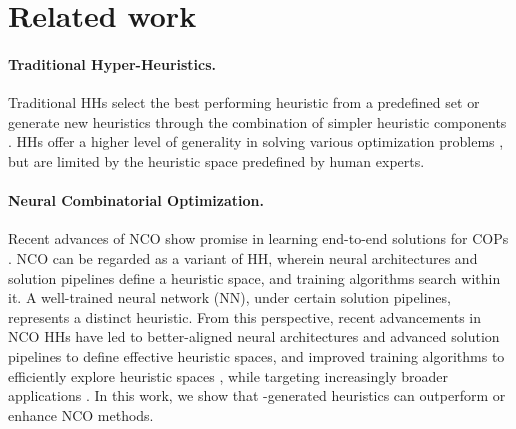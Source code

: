 \section{Related work}
\paragraph*{Traditional Hyper-Heuristics.}
Traditional HHs select the best performing heuristic from a predefined set \cite{drake2020recent_advances_in_selection_hh} or generate new heuristics through the combination of simpler heuristic components \cite{duflo2019gp_hh_tsp, zhao2023survey_automated_design_metaheuristic_algorithms}. HHs offer a higher level of generality in solving various optimization problems \cite{zhu2023surgical_case_assignment_problem_hh,zambrano2023automatic_hh_for_buck_boost,guerriero2023hierarchical_hh_bin_packing,lim2023simulated_annealing_hh_fjsp, zhang2023q_learning_hh, mohammad2023_hh_lion_optimizer}, but are limited by the heuristic space predefined by human experts.

\paragraph*{Neural Combinatorial Optimization.}
Recent advances of NCO show promise in learning end-to-end solutions for COPs \cite{bengio2021_ml4co_survey, yang2023_rl4co_survey, berto2023rl4co}. NCO can be regarded as a variant of HH, wherein neural architectures and solution pipelines define a heuristic space, and training algorithms search within it. A well-trained neural network (NN), under certain solution pipelines, represents a distinct heuristic. From this perspective, recent advancements in NCO HHs have led to better-aligned neural architectures \cite{jin2023pointerformer, luo2023nco_heavy_decoder, kim2023_gflownets, son2023_equity_transformer} and advanced solution pipelines \cite{kim2021lcp, ma2023neu_kopt, li2023t2t, xiao2023_nar_solver_tsp, ye2024glop, dernedde2024moco, bu2024tackling} to define effective heuristic spaces, and improved training algorithms to efficiently explore heuristic spaces \cite{kim2022symnco, jiang2023ensemble_vrp, drakulic2023bqnco, sun2023difusco, gao2023_transferrable_local_policy_vrp, xiao2024distilling_ar_for_nar, wang2024asp, kim2024gfacs}, while targeting increasingly broader applications \cite{chen2023efficient, zhou2023_lns_vrp_aph, ma2023metabox, tang2024himap}.
In this work, we show that \our{}-generated heuristics can outperform or enhance NCO methods.

